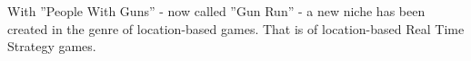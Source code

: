 With ''People With Guns'' - now called ''Gun Run'' - a new niche has been
created in the genre of location-based games. That is of location-based Real Time
Strategy games.\newline




%
%
%

%